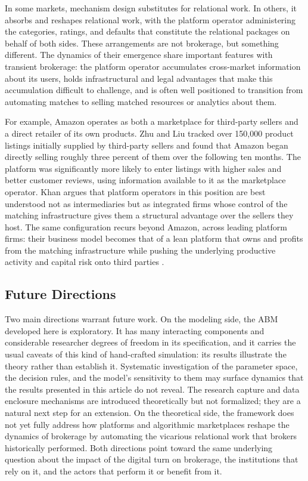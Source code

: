 \documentclass[
]{article}
\begin{document}
In some markets, mechanism design substitutes for relational work. In others, it absorbs and reshapes relational work, with the platform operator administering the categories, ratings, and defaults that constitute the relational packages on behalf of both sides. These arrangements are not brokerage, but something different. The dynamics of their emergence share important features with transient brokerage: the platform operator accumulates cross-market information about its users, holds infrastructural and legal advantages that make this accumulation difficult to challenge, and is often well positioned to transition from automating matches to selling matched resources or analytics about them.

For example, Amazon operates as both a marketplace for third-party sellers and a direct retailer of its own products. Zhu and Liu \autocite*{zhuCompetingComplementorsEmpirical} tracked over 150,000 product listings initially supplied by third-party sellers and found that Amazon began directly selling roughly three percent of them over the following ten months. The platform was significantly more likely to enter listings with higher sales and better customer reviews, using information available to it as the marketplace operator. Khan \autocite*{khanAmazonAntitrustParadox2016,khanSeparationPlatformsCommerce2019} argues that platform operators in this position are best understood not as intermediaries but as integrated firms whose control of the matching infrastructure gives them a structural advantage over the sellers they host. The same configuration recurs beyond Amazon, across leading platform firms: their business model becomes that of a lean platform that owns and profits from the matching infrastructure while pushing the underlying productive activity and capital risk onto third parties \autocite{rahmanRisePlatformBusiness2019}.

\subsection{Future Directions}

Two main directions warrant future work. On the modeling side, the ABM developed here is exploratory. It has many interacting components and considerable researcher degrees of freedom in its specification, and it carries the usual caveats of this kind of hand-crafted simulation: its results illustrate the theory rather than establish it. Systematic investigation of the parameter space, the decision rules, and the model's sensitivity to them may surface dynamics that the results presented in this article do not reveal. The research capture and data enclosure mechanisms are introduced theoretically but not formalized; they are a natural next step for an extension. On the theoretical side, the framework does not yet fully address how platforms and algorithmic marketplaces reshape the dynamics of brokerage by automating the vicarious relational work that brokers historically performed. Both directions point toward the same underlying question about the impact of the digital turn on brokerage, the institutions that rely on it, and the actors that perform it or benefit from it.
\end{document}
